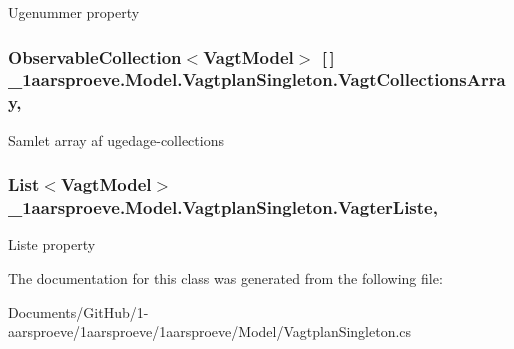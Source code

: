 Ugenummer property 

\hypertarget{class__1aarsproeve_1_1_model_1_1_vagtplan_singleton_a1517f87a41a08159dbb44fe024207b70}{}
\subsubsection[{Vagt\+Collections\+Array}]{\setlength{\rightskip}{0pt plus 5cm}Observable\+Collection$<${\bf Vagt\+Model}$>$ \mbox{[}$\,$\mbox{]} \+\_\+1aarsproeve.\+Model.\+Vagtplan\+Singleton.\+Vagt\+Collections\+Array\hspace{0.3cm}{\ttfamily [get]}, {\ttfamily [set]}}\label{class__1aarsproeve_1_1_model_1_1_vagtplan_singleton_a1517f87a41a08159dbb44fe024207b70}


Samlet array af ugedage-\/collections 

\hypertarget{class__1aarsproeve_1_1_model_1_1_vagtplan_singleton_a290144ecbd07ab56a48bb4f8555ac6b1}{}
\subsubsection[{Vagter\+Liste}]{\setlength{\rightskip}{0pt plus 5cm}List$<${\bf Vagt\+Model}$>$ \+\_\+1aarsproeve.\+Model.\+Vagtplan\+Singleton.\+Vagter\+Liste\hspace{0.3cm}{\ttfamily [get]}, {\ttfamily [set]}}\label{class__1aarsproeve_1_1_model_1_1_vagtplan_singleton_a290144ecbd07ab56a48bb4f8555ac6b1}


Liste property 



The documentation for this class was generated from the following file\+:\begin{DoxyCompactItemize}
\item 
Documents/\+Git\+Hub/1-\/aarsproeve/1aarsproeve/1aarsproeve/\+Model/Vagtplan\+Singleton.\+cs\end{DoxyCompactItemize}
